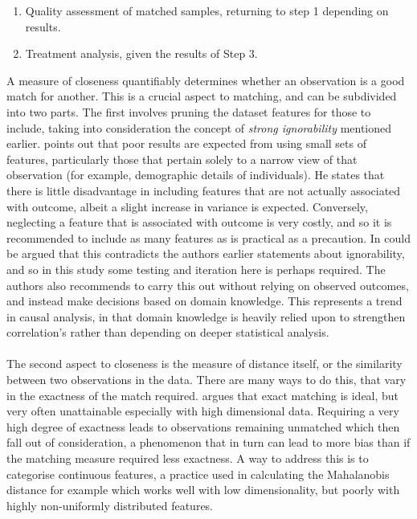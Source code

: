 {\begin {enumerate}
\item{Quality assessment of matched samples, returning to step 1 depending on results.}
\item{Treatment analysis, given the results of Step 3.}
\end{enumerate}
A measure of closeness quantifiably determines whether an observation is a good match for another. This is a crucial aspect to matching, and can be subdivided into two parts. The first involves pruning the dataset features for those to include, taking into consideration the concept of {\it strong ignorability} mentioned earlier. \cite{stuart2010matching} points out that poor results are expected from using small sets of features, particularly those that pertain solely to a narrow view of that observation (for example, demographic details of individuals). He states that there is little disadvantage in including features that are not actually associated with outcome, albeit a slight increase in variance is expected. Conversely, neglecting a feature that is associated with outcome is very costly, and so it is recommended to include as many features as is practical as a precaution. In could be argued that this contradicts the authors earlier statements about ignorability, and so in this study some testing and iteration here is perhaps required. The authors also recommends to carry this out without relying on observed outcomes, and instead make decisions based on domain knowledge. This represents a trend in causal analysis, in that domain knowledge is heavily relied upon to strengthen correlation's rather than depending on deeper statistical analysis. \\\\
The second aspect to closeness is the measure of distance itself, or the similarity between two observations in the data. There are many ways to do this, that vary in the exactness of the match required. \cite{stuart2010matching} argues that exact matching is ideal, but very often unattainable especially with high dimensional data. Requiring a very high degree of exactness leads to observations remaining unmatched which then fall out of consideration, a phenomenon that in turn can lead to more bias than if the matching measure required less exactness. A way to address this is to categorise continuous features, a practice used in calculating the Mahalanobis distance for example which works well with low dimensionality, but poorly with highly non-uniformly distributed features.
\\\\ 
}
